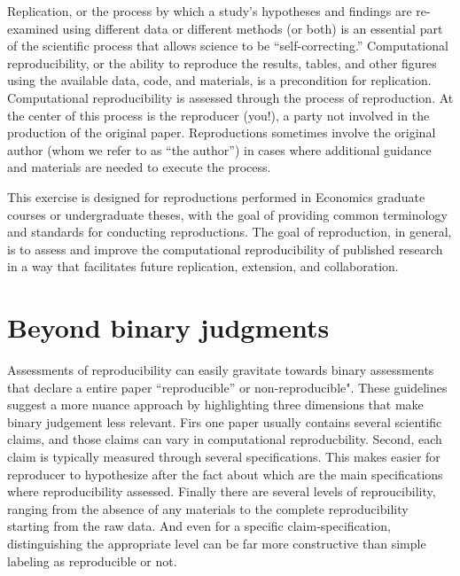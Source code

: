 \documentclass[]{book}
\begin{document}
Replication, or the process by which a study's hypotheses and findings are re-examined using different data or different methods (or both) \citep{King95} is an essential part of the scientific process that allows science to be ``self-correcting.'' Computational reproducibility, or the ability to reproduce the results, tables, and other figures using the available data, code, and materials, is a precondition for replication. Computational reproducibility is assessed through the process of reproduction. At the center of this process is the reproducer (you!), a party not involved in the production of the original paper. Reproductions sometimes involve the original author (whom we refer to as ``the author'') in cases where additional guidance and materials are needed to execute the process.

This exercise is designed for reproductions performed in Economics graduate courses or undergraduate theses, with the goal of providing common terminology and standards for conducting reproductions. The goal of reproduction, in general, is to assess and improve the computational reproducibility of published research in a way that facilitates future replication, extension, and collaboration.

\hypertarget{beyond-binary-judgments}{%
\section{Beyond binary judgments}\label{beyond-binary-judgments}}

Assessments of reproducibility can easily gravitate towards binary assessments that declare a entire paper ``reproducible'' or non-reproducible". These guidelines suggest a more nuance approach by highlighting three dimensions that make binary judgement less relevant. Firs one paper usually contains several scientific claims, and those claims can vary in computational reproducbility. Second, each claim is typically measured through several specifications. This makes easier for reproducer to hypothesize after the fact about which are the main specifications where reproducibility assessed. Finally there are several levels of reproucibility, ranging from the absence of any materials to the complete reproducibility starting from the raw data. And even for a specific claim-specification, distinguishing the appropriate level can be far more constructive than simple labeling as reproducible or not.
\end{document}
